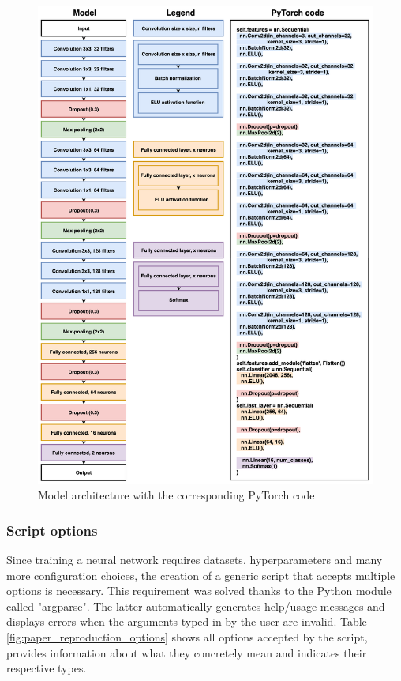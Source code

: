\begin{figure}[!h]
\centering
\includegraphics[width=1\textwidth, keepaspectratio=true]{./figures/model_paper_manual.png}
\caption{Model architecture with the corresponding PyTorch code}
\label{fig:paper_model}
\end{figure}

\subsubsection{Script options}
\setlength{\marginparwidth}{3cm}\leavevmode {}Since training a neural network requires datasets, hyperparameters and many more configuration choices, the creation of a generic script that accepts multiple options is necessary. This requirement was solved thanks to the Python module called "argparse". The latter automatically generates help/usage messages and displays errors when the arguments typed in by the user are invalid. Table \ref{fig:paper_reproduction_options} shows all options accepted by the script, provides information about what they concretely mean and indicates their respective types.


